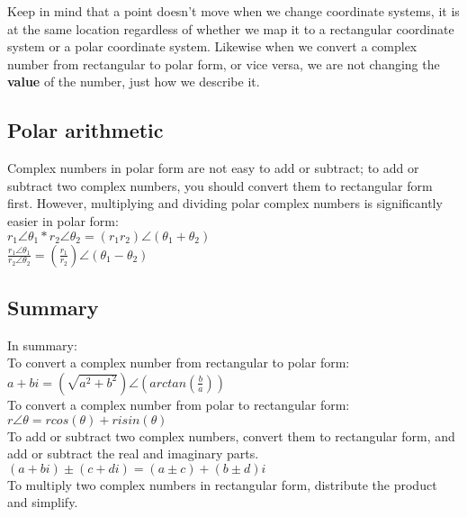 Keep in mind that a point doesn't move when we change coordinate systems, it is at the same location regardless of whether we map it to a rectangular coordinate system or a polar coordinate system.  Likewise when we convert a complex number from rectangular to polar form, or vice versa, we are not changing the {\bf value} of the number, just how we describe it.\\

\subsection{Polar arithmetic}

Complex numbers in polar form are not easy to add or subtract;  to add or subtract two complex numbers, you should convert them to rectangular form first.  However, multiplying and dividing polar complex numbers is significantly easier in polar form:\\

\tab$r_1\angle\theta_1 * r_2\angle\theta_2 = (r_1r_2)\angle(\theta_1 + \theta_2)$ \\

\tab$\frac{r_1\angle\theta_1}{r_2\angle\theta_2} = (\frac{r_1}{r_2})\angle(\theta_1 - \theta_2)$ \\

\subsection{Summary}

In summary:\\

To convert a complex number from rectangular to polar form:\\

\tab$a+bi = (\sqrt{a^2+b^2})\angle (arctan(\frac{b}{a}))$\\

To convert a complex number from polar to rectangular form:\\

\tab$r\angle\theta = rcos(\theta) + r i sin(\theta)$\\

To add or subtract two complex numbers, convert them to rectangular form, and add or subtract the real and imaginary parts.\\

\tab$(a+bi) \pm (c+di) = (a \pm c) + (b \pm d)i$\\

To multiply two complex numbers in rectangular form, distribute the product and simplify.\\

